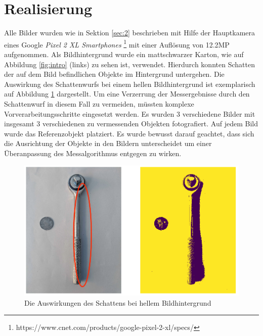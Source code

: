 \documentclass[twocolumn,10pt]{asme2ej}
\begin{document}
\section{Realisierung}

Alle Bilder wurden wie in Sektion \ref{sec:2} beschrieben mit Hilfe der Hauptkamera eines Google \emph{Pixel 2 XL Smartphones} \footnote{https://www.cnet.com/products/google-pixel-2-xl/specs/} mit einer Auflösung von 12.2MP aufgenommen. Als Bildhintergrund wurde ein mattschwarzer Karton, wie auf Abbildung \ref{fig:intro} (links) zu sehen ist, verwendet. Hierdurch konnten Schatten der auf dem Bild befindlichen Objekte im Hintergrund untergehen. Die Auswirkung des Schattenwurfs bei einem hellen Bildhintergrund ist exemplarisch auf Abbildung \ref{fig:shade} dargestellt. Um eine Verzerrung der Messergebnisse durch den Schattenwurf in diesem Fall zu vermeiden, müssten komplexe Vorverarbeitungsschritte eingesetzt werden. Es wurden 3 verschiedene Bilder mit insgesamt 3 verschiedenen zu vermessenden Objekten fotografiert. Auf jedem Bild wurde das Referenzobjekt platziert. Es wurde bewusst darauf geachtet, dass sich die Ausrichtung der Objekte in den Bildern unterscheidet um einer Überanpassung des Messalgorithmus entgegen zu wirken.

\begin{figure}
	\includegraphics[scale=0.25]{bad_shade_white_background.png}
	\caption[center]{Die Auswirkungen des Schattens bei hellem Bildhintergrund}
	\label{fig:shade}
\end{figure}
\end{document}
